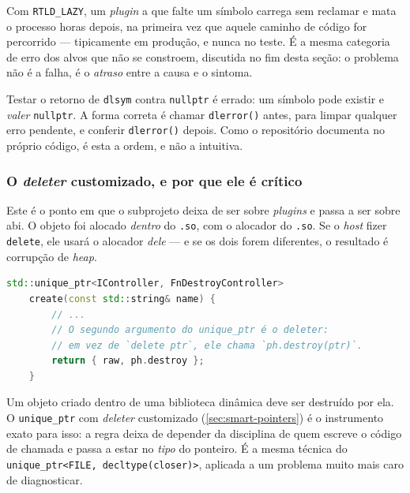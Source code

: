 \begin{armadilha}
Com \texttt{RTLD\_LAZY}, um \emph{plugin} a que falte um símbolo carrega sem
reclamar e mata o processo horas depois, na primeira vez que aquele caminho de
código for percorrido --- tipicamente em produção, e nunca no teste. É a mesma
categoria de erro dos alvos que não se constroem, discutida no fim desta seção:
o problema não é a falha, é o \emph{atraso} entre a causa e o sintoma.
\end{armadilha}

\begin{armadilha}
Testar o retorno de \texttt{dlsym} contra \texttt{nullptr} é errado: um símbolo
pode existir e \emph{valer} \texttt{nullptr}. A forma correta é chamar
\texttt{dlerror()} antes, para limpar qualquer erro pendente, e conferir
\texttt{dlerror()} depois. Como o repositório documenta no próprio código, é
esta a ordem, e não a intuitiva.
\end{armadilha}

\subsubsection{O \emph{deleter} customizado, e por que ele é crítico}

Este é o ponto em que o subprojeto deixa de ser sobre \emph{plugins} e passa a
ser sobre \gls{abi}. O objeto foi alocado \emph{dentro} do \texttt{.so}, com o
alocador do \texttt{.so}. Se o \emph{host} fizer \texttt{delete}, ele usará o
alocador \emph{dele} --- e se os dois forem diferentes, o resultado é corrupção
de \emph{heap}.

\begin{lstlisting}[style=bt, language=C++,
    caption={O \emph{deleter} como parâmetro de \emph{template}, em
             \texttt{src/plugin\_registry/plugin\_registry.hpp}.}]
    std::unique_ptr<IController, FnDestroyController>
    create(const std::string& name) {
        // ...
        // O segundo argumento do unique_ptr é o deleter:
        // em vez de `delete ptr`, ele chama `ph.destroy(ptr)`.
        return { raw, ph.destroy };
    }
\end{lstlisting}

\begin{regra}
Um objeto criado dentro de uma biblioteca dinâmica deve ser destruído por ela.
O \texttt{unique\_ptr} com \emph{deleter} customizado
(\cref{sec:smart-pointers}) é o instrumento exato para isso: a regra deixa de
depender da disciplina de quem escreve o código de chamada e passa a estar no
\emph{tipo} do ponteiro. É a mesma técnica do \texttt{unique\_ptr<FILE,
decltype(closer)>}, aplicada a um problema muito mais caro de diagnosticar.
\end{regra}

